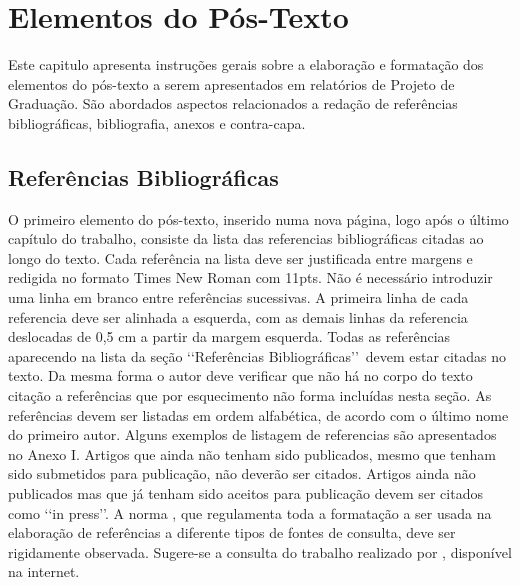 \chapter[Elementos do Pós-Texto]{Elementos do Pós-Texto}
Este capitulo apresenta instruções gerais sobre a elaboração e formatação dos
elementos do pós-texto a serem apresentados em relatórios de Projeto de
Graduação. São abordados aspectos relacionados a redação de referências
bibliográficas, bibliografia, anexos e contra-capa.
\section{Referências Bibliográficas}
O primeiro elemento do pós-texto, inserido numa nova página, logo após o último
capítulo do trabalho, consiste da lista das referencias bibliográficas citadas
ao longo do texto.
Cada referência na lista deve ser justificada entre margens e redigida no
formato Times New Roman com 11pts. Não é necessário introduzir uma linha em
branco entre referências sucessivas.
A primeira linha de cada referencia deve ser alinhada a esquerda, com as demais
linhas da referencia deslocadas de 0,5 cm a partir da margem esquerda.
Todas as referências aparecendo na lista da seção \lq\lq Referências
Bibliográficas\rq\rq\ devem estar citadas no texto. Da mesma forma o autor deve
verificar que não há no corpo do texto citação a referências que por
esquecimento não forma incluídas nesta seção.
As referências devem ser listadas em ordem alfabética, de acordo com o último
nome do primeiro autor. Alguns exemplos de listagem de referencias são
apresentados no Anexo I.
Artigos que ainda não tenham sido publicados, mesmo que tenham sido submetidos
para publicação, não deverão ser citados. Artigos ainda não publicados mas que
já tenham sido aceitos para publicação devem ser citados como \lq\lq in
press\rq\rq.
A norma \cite{NBR6034:2000}, que regulamenta toda a formatação a ser usada na
elaboração de referências a diferente tipos de fontes de consulta, deve ser
rigidamente observada. Sugere-se a consulta do trabalho realizado por
\cite{arruda2007}, disponível na internet.

